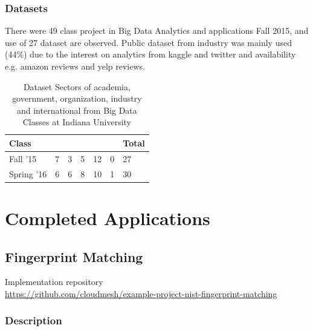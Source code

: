 \documentclass[9pt,twocolumn,twoside]{styles/osajnl}
\newcommand*\rot{\rotatebox{90}}
\begin{document}
\subsubsection{Datasets}

There were 49 class project in Big Data Analytics and applications Fall 2015,
and use of 27 dataset are observed. Public dataset from industry was mainly
used (44\%) due to the interest on analytics from kaggle and twitter and
availability e.g. amazon reviews and yelp reviews.

\begin{table}[htb]
  \begin{center}
    \begin{small}
      \caption{Dataset Sectors of academia, government, organization,
        industry and international from Big Data Classes at Indiana
        University}
      \label{tab:dataset-sector-iu}
      \begin{tabular}{l|l|l|l|l|l|l}

    Class & \rot{Academia} & \rot{Government} & \rot{Organization} & \rot{Industry} & \rot{International} & Total \\ \hline \hline
    Fall '15   & 7          & 3            & 5       & 12        & 0             & 27    \\ \hline
    Spring '16 & 6          & 6            & 8       & 10         & 1             & 30    \\ \hline
      \end{tabular}
    \end{small}
  \end{center}
\end{table}



\section{Completed Applications}

\subsection{Fingerprint Matching}

Implementation repository\\
\url{https://github.com/cloudmesh/example-project-nist-fingerprint-matching}

\subsubsection{Description}
\end{document}
